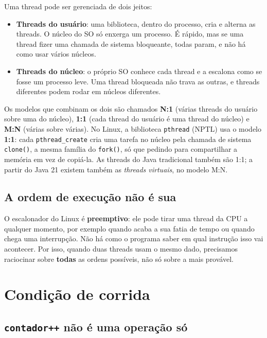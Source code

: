 \documentclass[11pt,a4paper]{article}
\newcommand{\cmd}[1]{\texttt{#1}}
\begin{document}
Uma thread pode ser gerenciada de dois jeitos:

\begin{itemize}
    \item \textbf{Threads do usuário}: uma biblioteca, dentro do processo, cria e alterna as threads. O núcleo do SO só enxerga um processo. É rápido, mas se uma thread fizer uma chamada de sistema bloqueante, todas param, e não há como usar vários núcleos.
    \item \textbf{Threads do núcleo}: o próprio SO conhece cada thread e a escalona como se fosse um processo leve. Uma thread bloqueada não trava as outras, e threads diferentes podem rodar em núcleos diferentes.
\end{itemize}

Os modelos que combinam os dois são chamados \textbf{N:1} (várias threads do usuário sobre uma do núcleo), \textbf{1:1} (cada thread do usuário é uma thread do núcleo) e \textbf{M:N} (várias sobre várias). No Linux, a biblioteca \cmd{pthread} (NPTL) usa o modelo \textbf{1:1}: cada \cmd{pthread\_create} cria uma tarefa no núcleo pela chamada de sistema \cmd{clone()}, a mesma família do \cmd{fork()}, só que pedindo para compartilhar a memória em vez de copiá-la. As threads do Java tradicional também são 1:1; a partir do Java 21 existem também as \emph{threads virtuais}, no modelo M:N.

\subsection{A ordem de execução não é sua}

O escalonador do Linux é \textbf{preemptivo}: ele pode tirar uma thread da CPU a qualquer momento, por exemplo quando acaba a sua fatia de tempo ou quando chega uma interrupção. Não há como o programa saber em qual instrução isso vai acontecer. Por isso, quando duas threads usam o mesmo dado, precisamos raciocinar sobre \textbf{todas} as ordens possíveis, não só sobre a mais provável.

\section{Condição de corrida}

\subsection{\texttt{contador++} não é uma operação só}
\end{document}
